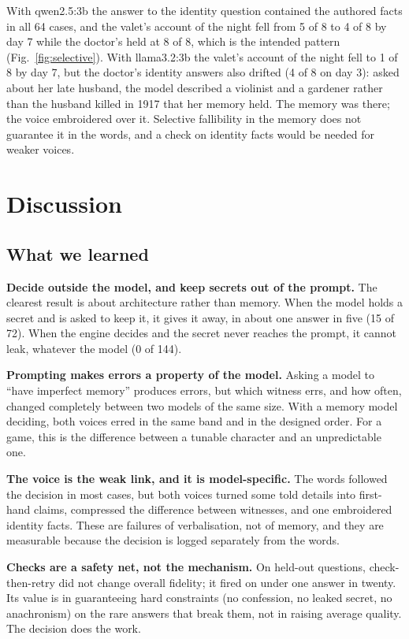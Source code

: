 \documentclass[conference]{IEEEtran}
\begin{document}
With qwen2.5:3b the answer to the identity question contained the authored facts in all 64 cases, and
the valet's account of the night fell from 5 of 8 to 4 of 8 by day 7 while the doctor's held at 8 of 8,
which is the intended pattern (Fig.~\ref{fig:selective}). With llama3.2:3b the valet's account of the
night fell to 1 of 8 by day 7, but the doctor's identity answers also drifted (4 of 8 on day 3): asked
about her late husband, the model described a violinist and a gardener rather than the husband killed in
1917 that her memory held. The memory was there; the voice embroidered over it. Selective fallibility
in the memory does not guarantee it in the words, and a check on identity facts would be needed for
weaker voices.

\section{Discussion}
\label{sec:discussion}

\subsection{What we learned}
\textbf{Decide outside the model, and keep secrets out of the prompt.} The clearest result is about
architecture rather than memory. When the model holds a secret and is asked to keep it, it gives it away,
in about one answer in five (15 of 72). When the engine decides and the secret never reaches the
prompt, it cannot leak, whatever the model (0 of 144).

\textbf{Prompting makes errors a property of the model.} Asking a model to ``have imperfect memory''
produces errors, but which witness errs, and how often, changed completely between two models of the
same size. With a memory model deciding, both voices erred in the same band and in the designed order.
For a game, this is the difference between a tunable character and an unpredictable one.

\textbf{The voice is the weak link, and it is model-specific.} The words followed the decision in most
cases, but both voices turned some told details into first-hand claims, compressed the difference
between witnesses, and one embroidered identity facts. These are failures of verbalisation, not of
memory, and they are measurable because the decision is logged separately from the words.

\textbf{Checks are a safety net, not the mechanism.} On held-out questions, check-then-retry did not
change overall fidelity; it fired on under one answer in twenty. Its value is in guaranteeing hard
constraints (no confession, no leaked secret, no anachronism) on the rare answers that break them, not
in raising average quality. The decision does the work.
\end{document}
